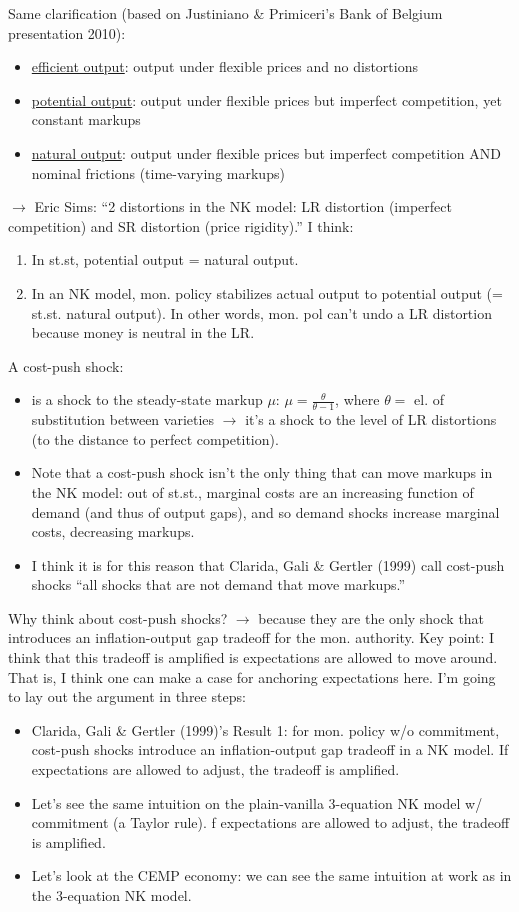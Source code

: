 \documentclass[11pt]{article}
\renewcommand{\[}{\begin{equation}}
\renewcommand{\]}{\end{equation}}
\begin{document}
Same clarification (based on Justiniano \& Primiceri's Bank of Belgium presentation 2010):
\begin{itemize}
\item \underline{efficient output}: output under flexible prices and no distortions
\item \underline{potential output}: output under flexible prices but imperfect competition, yet constant markups
\item \underline{natural output}: output under flexible prices but imperfect competition AND nominal frictions (time-varying markups)
\end{itemize}
$\rightarrow$ Eric Sims: ``2 distortions in the NK model: LR distortion (imperfect competition) and SR distortion (price rigidity).''
I think:
\begin{enumerate}
\item In st.st, potential output = natural output. 
\item In an NK model, mon. policy stabilizes actual output to potential output (= st.st. natural output). In other words, mon. pol can't undo a LR distortion because money is neutral in the LR.
\end{enumerate}
A cost-push shock:
\begin{itemize}
\item is a shock to the steady-state markup $\mu$: $\mu = \frac{\theta}{\theta-1}$, where $\theta =$ el. of substitution between varieties $\rightarrow$ it's a shock to the level of LR distortions (to the distance to perfect competition).
\item Note that a cost-push shock isn't the only thing that can move markups in the NK model: out of st.st., marginal costs are an increasing function of demand (and thus of output gaps), and so demand shocks increase marginal costs, decreasing markups.
\item I think it is for this reason that Clarida, Gali \& Gertler (1999) call cost-push shocks ``all shocks that are not demand that move markups.''
\end{itemize}
Why think about cost-push shocks? $\rightarrow$ because they are the only shock that introduces an inflation-output gap tradeoff for the mon. authority. Key point: I think that this tradeoff is amplified is expectations are allowed to move around. That is, I think one can make a case for anchoring expectations here. I'm going to lay out the argument in three steps:
\begin{itemize}
\item Clarida, Gali \& Gertler (1999)'s Result 1: for mon. policy w/o commitment, cost-push shocks introduce an inflation-output gap tradeoff in a NK model. If expectations are allowed to adjust, the tradeoff is amplified.
\item Let's see the same intuition on the plain-vanilla 3-equation NK model w/ commitment (a Taylor rule). f expectations are allowed to adjust, the tradeoff is amplified.
\item Let's look at the CEMP economy: we can see the same intuition at work as in the 3-equation NK model.
\end{itemize}
\end{document}
